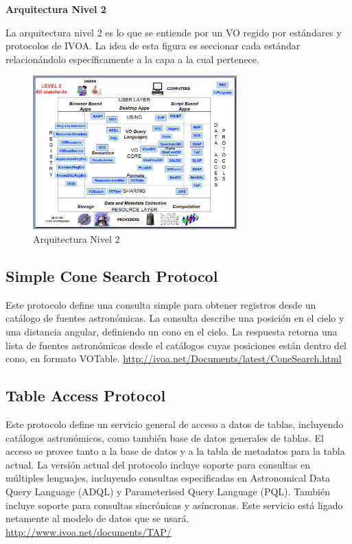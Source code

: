 \textbf{Arquitectura Nivel 2}%


La arquitectura nivel 2 es lo que se entiende por un VO regido por estándares
y protocolos de IVOA.
La idea de esta figura es seccionar cada estándar relacionándolo específicamente
a la capa a la cual pertenece.

\begin{figure}
    \centering
    \includegraphics[width=0.7\textwidth]{img/arquitectura_2.png}
    \caption{Arquitectura Nivel 2}
    \label{fig:nivel2}
\end{figure}


\subsection{Simple Cone Search Protocol}


Este protocolo define una consulta simple para obtener registros desde un
catálogo de fuentes astronómicas. La consulta describe una posición en el cielo
y una distancia angular, definiendo un cono en el cielo. La respuesta retorna
una lista de fuentes astronómicas desde el catálogos cuyas posiciones están
dentro del cono, en formato VOTable.
\url{http://ivoa.net/Documents/latest/ConeSearch.html}

\subsection{Table Access Protocol}


Este protocolo define un servicio general de acceso a datos de tablas,
incluyendo catálogos astronómicos, como también base de datos generales de
tablas. El acceso se provee tanto a la base de datos y a la tabla de metadatos
para la tabla actual. La versión actual del protocolo incluye soporte para
consultas en múltiples lenguajes, incluyendo consultas especificadas en
Astronomical Data Query Language (ADQL) y Parameterised Query Language (PQL).
También incluye soporte para consultas sincrónicas y asíncronas. Este servicio
está ligado netamente al modelo de datos que se usará.
\url{http://www.ivoa.net/documents/TAP/}

